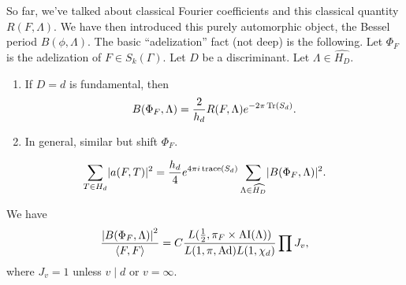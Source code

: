 \documentclass[reqno]{amsart} 
\begin{document}
So far, we've talked about classical Fourier coefficients and this classical quantity $R(F, \Lambda)$.  We have then introduced this purely automorphic object, the Bessel period $B(\phi, \Lambda)$.  The basic ``adelization'' fact (not deep) is the following.  Let $\Phi_F$ is the adelization of $F \in S_k(\Gamma)$.  Let $D$ be a discriminant.  Let $\Lambda \in \widehat{H_D}$.
\begin{enumerate}
\item If $D = d$ is fundamental, then
  \begin{equation*}
    B(\Phi_F, \Lambda ) = \frac{2}{h_d}
    R(F, \Lambda) e^{- 2 \pi \operatorname{Tr}(S_d)}.    
  \end{equation*}
\item In general, similar but shift $\Phi_F$.
\end{enumerate}

\begin{equation*}
  \sum_{T \in H_d } \lvert a(F, T) \rvert^2 = \frac{h_d}{4} e^{4 \pi i \operatorname{trace}(S_d)}
\sum_{\Lambda \in \widehat{H_D }} \lvert B(\Phi_F, \Lambda ) \rvert^2.  
\end{equation*}

\begin{theorem}\label{theorem:cnfg5jymlf}
  We have
  \begin{equation*}
    \frac{\left\lvert B(\Phi_F, \Lambda ) \right\rvert^2 }{ \left\langle F, F \right\rangle}
    = C \frac{L(\tfrac{1}{2}, \pi_F \times \operatorname{AI}(\Lambda))}{L(1, \pi, \operatorname{Ad}) L(1, \chi_d)} \prod J_v,    
  \end{equation*}
  where $J_v = 1$ unless $v \mid d$ or $v = \infty$.
\end{theorem}
\end{document}
